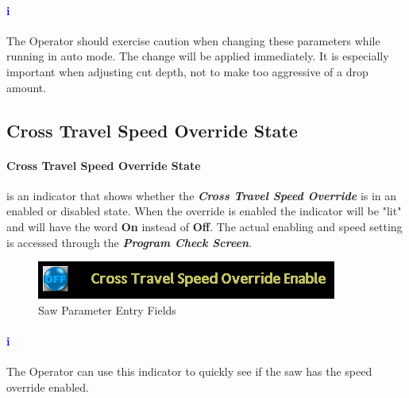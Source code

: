 \paragraph{\textbf{\LARGE \textcolor{blue}{i}}}The Operator should exercise caution when changing these parameters while running in auto mode. The change will be applied immediately. It is especially important when adjusting cut depth, not to make too aggressive of a drop amount.
\subsection{Cross Travel Speed Override State}\paragraph*{Cross Travel Speed Override State}is an indicator that shows whether the \textbf{\textit{Cross Travel Speed Override}} is in an enabled or disabled state. When the override is enabled the indicator will be "lit" and will have the word \textbf{On} instead of \textbf{Off}. The actual enabling and speed setting is accessed through the \textbf{\textit{Program Check Screen}}. 
\begin{figure}
	\centering
	\includegraphics[width=.2\linewidth]{screen-captures/program/pgm-cross-travel-spd-or}
	\caption{Saw Parameter Entry Fields}
	\label{fig:pgm-cross-travel-spd-or}
\end{figure}
\paragraph{\textbf{\LARGE \textcolor{blue}{i}}}The Operator can use this indicator to quickly see if the saw has the speed override enabled.
